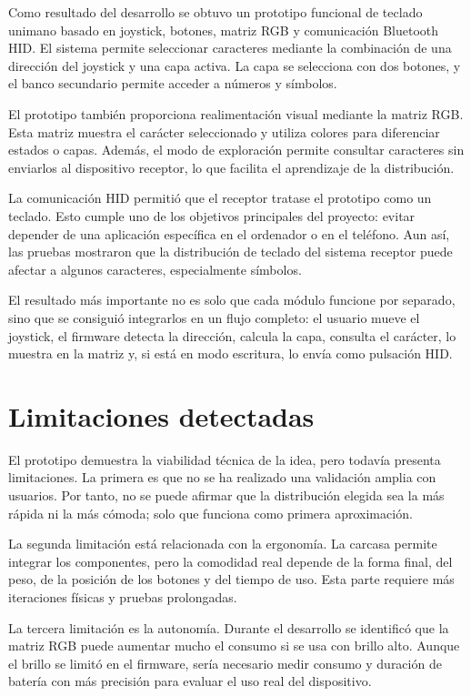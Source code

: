 Como resultado del desarrollo se obtuvo un prototipo funcional de teclado unimano basado en joystick, botones, matriz RGB y comunicación Bluetooth HID. El sistema permite seleccionar caracteres mediante la combinación de una dirección del joystick y una capa activa. La capa se selecciona con dos botones, y el banco secundario permite acceder a números y símbolos.

El prototipo también proporciona realimentación visual mediante la matriz RGB. Esta matriz muestra el carácter seleccionado y utiliza colores para diferenciar estados o capas. Además, el modo de exploración permite consultar caracteres sin enviarlos al dispositivo receptor, lo que facilita el aprendizaje de la distribución.

La comunicación HID permitió que el receptor tratase el prototipo como un teclado. Esto cumple uno de los objetivos principales del proyecto: evitar depender de una aplicación específica en el ordenador o en el teléfono. Aun así, las pruebas mostraron que la distribución de teclado del sistema receptor puede afectar a algunos caracteres, especialmente símbolos.

El resultado más importante no es solo que cada módulo funcione por separado, sino que se consiguió integrarlos en un flujo completo: el usuario mueve el joystick, el firmware detecta la dirección, calcula la capa, consulta el carácter, lo muestra en la matriz y, si está en modo escritura, lo envía como pulsación HID.

\section{Limitaciones detectadas}
\label{sec:limitaciones-detectadas}

El prototipo demuestra la viabilidad técnica de la idea, pero todavía presenta limitaciones. La primera es que no se ha realizado una validación amplia con usuarios. Por tanto, no se puede afirmar que la distribución elegida sea la más rápida ni la más cómoda; solo que funciona como primera aproximación.

La segunda limitación está relacionada con la ergonomía. La carcasa permite integrar los componentes, pero la comodidad real depende de la forma final, del peso, de la posición de los botones y del tiempo de uso. Esta parte requiere más iteraciones físicas y pruebas prolongadas.

La tercera limitación es la autonomía. Durante el desarrollo se identificó que la matriz RGB puede aumentar mucho el consumo si se usa con brillo alto. Aunque el brillo se limitó en el firmware, sería necesario medir consumo y duración de batería con más precisión para evaluar el uso real del dispositivo.

